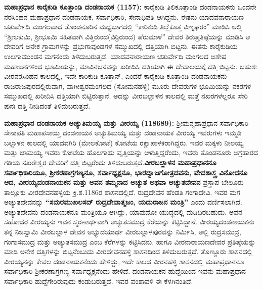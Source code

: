 \textbf{ಮಹಾಪ್ರಧಾನ ಕಾರೈಕುಡಿ ಕೂತ್ತಾಂಡಿ ದಂಡನಾಯಕ (1157):} ಕಾರೈಕುಡಿ ತಿಲಿಕೂತ್ತಾಂಡಿ ದಂಡನಾಯಕನು ಒಂದನೇ ನರಸಿಂಹನ ಮಹಾಪ್ರಧಾನ ದಂಡನಾಯಕ, ಸರ್ವಾಧಿಕಾರಿ, ಸೇನಾಧಿಪತಿ ಆಗಿದ್ದನು. ಈತನು ಯಾದವ\-ನಾರಾಯಣ ಚತುರ್ವೇದಿ ಮಂಗಲವಾದ ತೊಂಡನೂರಿನ ಮಧ್ಯಭಾಗದಲ್ಲಿ “ಕಾರಿಕುಡಿ ತಿಲ್ಲೆಕೂತ್ತ ವಿಣ್ನಘರಂ” ಮಾಡಿಸಿ ಅಲ್ಲಿ “ಶ‍್ರೀಲಕುಮಿ, ಶ‍್ರೀಭೂಮಿ ಸಹಿತವಾಗಿ ವಿತ್ತಿರುಂದ(ವಿರ್ರಿರುಂದ) ಪೆರುಮಾಳೆ” ದೇವರ ತಿರುಪ್ರತಿಷ್ಠೆಯನ್ನು ಮಾಡಿಸಿ ಆ ದೇವರಿಗೆ ಅನೇಕ ಗ್ರಾಮಗಳನ್ನು ಪ್ರಭುಗಾವುಂಡಗಳ ಸಮ್ಮುಖದಲ್ಲಿ ದತ್ತಿಯಾಗಿ ಬಿಟ್ಟನು. ಈತನು ಕಾರೈಕುಡಿಯ ಉಲಗಾಮುಂಡನ ಮಗನೆಂದು ತಿಳಿದುಬರುತ್ತದೆ. ಯಾದವನಾರಾಯಣ ಚತುರ್ವೇದಿ ಮಂಗಲದ ಅಶೇಷ ಮಹಾಜನ\-ಗಳಿಂದ ಭೂಮಿಯನ್ನು, ಮಾವಿನಬನವನ್ನು ಖರೀದಿಸಿ ದತ್ತಿಯಾಗಿ ಈ ದೇವಾಲಯಕ್ಕೆ ದತ್ತಿ ಬಿಟ್ಟನು. ಬಹುಶಃ ವೀರನರಸಿಂಹನ ಕಾಲದಲ್ಲಿ, ಇದೇ ಕಾರಿಕುಡಿ ಕೂತ್ತಾನ್​, ಎಂದರೆ ಕಾರೈಕುಡಿ ಕೂತ್ತಾಂಡಿ ದಂಡನಾಯಕನು ರಾಜರಾಜಪುರ\-ದಲ್ಲಿರುವಾಗ, ವಾಗೀಶ್ವರಮಂಗಲದ (ಸೋಮನಹಳ್ಳಿ) ಮೂರು ದೇವರುಗಳ ಭೂಮಿಯನ್ನು ನಕರಗಳ ಸಮ್ಮುಖದಲ್ಲಿ ಖರೀದಿಸಿ ದತ್ತಿಯಾಗಿ ಬಿಟ್ಟಿರುತ್ತಾನೆ. ಅದನ್ನು ವೀರಬಲ್ಲಾಳನ ಕಾಲದಲ್ಲಿ ಮತ್ತೆ ನಖರಗಳೆಲ್ಲರೂ ಸೇರಿ ಪುನಃ ದತ್ತಿ ನೀಡಿದಂತೆ ತಿಳಿದುಬರುತ್ತದೆ.

\textbf{ಮಹಾಪ್ರಧಾನ ದಂಡನಾಯಕ ಅಚ್ಯುತಿಮಯ್ಯ ಮತ್ತು ವೀರಯ್ಯ (1186\general{\enginline{-}}89):} ಶ‍್ರೀಮನ್ಮಹಾಪ್ರಧಾನ ಸರ್ವಾಧಿಕಾರಿ ಸೇನಾಪತಿ ಮಹಾಪಸಾಯ್ತ ದಂಡನಾಯಕ ಅಚ್ಯುತಿಮಯ್ಯ ಮತ್ತು ದಂಡನಾಯಕ ವೀರಯ್ಯ ಇವರುಗಳು ಇಮ್ಮಡಿ ಬಲ್ಲಾಳನ ಕಾಲದಲ್ಲಿ ಯಾದವಗಿರಿ (ಮೇಲಕೋಟೆ) ಕೋಟೆಯ ರಕ್ಷಾಪಾಳಕರಾಗಿದ್ದರು. ಇವರ ಮಕ್ಕಳು ನೀಲಯ್ಯ ಮತ್ತು ಚಾಮಯ್ಯ ಇವರು ಕೋಟೆಯ ಹೊಲಗಾಹು ವೃತ್ತಿಯನ್ನು ಆಳುತ್ತಿದ್ದರೆಂದು, ಇವರು ತೊಂಡನೂರು ಅಗ್ರಹಾರದ ಗಡಿಯ ನಖರೇಶ್ವರ ದೇವರಿಗೆ ದತ್ತಿ ಬಿಟ್ಟರೆಂದು ತಿಳಿದುಬರುತ್ತದೆ.\textbf{ವೀರಬಲ್ಲಾಳನ ಮಹಾಪ್ರಧಾನನೂ ಸರ್ವಾಧಿಕಾರಿಯೂ, ಶ‍್ರೀಕರಣಾಗ್ರಗಣ್ಯನೂ, ಸರ್ವಾಧ್ಯಕ್ಷನೂ, ಭಾರದ್ವಾಜಗೋತ್ರದವನು, ವೇದಶಾಸ್ತ್ರ ವಿನೋದನೂ ಆದ, ವೀರಯ್ಯದಂಡನಾಯಕನ ಮತ್ತು ಅವನ ತಮ್ಮನಾದ ಅಚ್ಯುತ ಅಥವಾ ಅಚ್ಯುತದೇವನ }ಪ್ರಸ್ತಾಪ ಬೇಲೂರು ತಾಲ್ಲೂಕು ವೀರದೇವನಹಳ್ಳಿಯ ಕ್ರಿ.ಶ.1186ರ ಶಾಸನ\-ದಲ್ಲಿದೆ. ರುದ್ರದೇವನ ಹೆಂಡತಿ ಗಂಗಾದೇವಿ. ಇವರ ಮಗ ಅಚ್ಯುತದೇವನನ್ನು \textbf{“ಸಮರಮುಖಲಸದ್​ ರುದ್ರದೇವಾತ್ಮಜಂ, ಯದುರಾಜನ ಮಂತ್ರಿ”} ಎಂದು ವರ್ಣಿಸಲಾಗಿದೆ. ಅಚ್ಯುತದೇವನು ದಂಡನಾಯಕನೂ ಮಂತ್ರಿಯೂ ಆಗಿದ್ದು, ಯಾವುದೋ ಯುದ್ಧದಲ್ಲಿ ಮಡಿದಿರಬಹುದು. ಅವನ ಸಹೋದರ ವೀರಯ್ಯನು ಇವನ ಸ್ಮರಣಾರ್ಥವಾಗಿ ಅಚ್ಯುತಸಮುದ್ರ ಕೆರೆಯನ್ನು ಕಟ್ಟಿಸಿದ್ದಾನೆ. ವೀರಯ್ಯದಂಡನಾಯಕನು ತನ್ನ ನಿಜಸ್ವಾಮಿ ವೀರಬಲ್ಲಾಳ ದೇವನ ಅಭ್ಯುದಯಾರ್ಥ ವೀರಬಲ್ಲಾಳಪುರವನ್ನು ನಿರ್ಮಿಸಿ, ಅಲ್ಲಿ ರುದ್ರಸಮುದ್ರ, ಗಂಗಾಸಮುದ್ರ ಮತ್ತು ಅಚ್ಯುತಸಮುದ್ರ ಎಂಬ ಕೆರೆಗಳನ್ನು ಕಟ್ಟಿಸಿದನು. ಹಾಗೂ ವೀರನಾರಾಯಣದೇವರ ಪ್ರತಿಷ್ಠೆಯನ್ನು ಮಾಡಿ ಅನೇಕ ದತ್ತಿಗಳನ್ನು ಬಿಟ್ಟನೆಂಬುದು ವೀರದೇವನಹಳ್ಳಿ ಶಾಸನದಿಂದ ತಿಳಿದುಬರುತ್ತದೆ. ತೊಣ್ಣೂರು ಶಾಸನದಲ್ಲಿ ವೀರಯ್ಯನನ್ನು ಕೇವಲ ದಂಡನಾಯಕನೆಂದು ಹೇಳಿದ್ದು, ಇದೇ ಕಾಲದ ವೀರನಹಳ್ಳಿ ಶಾಸನದಲ್ಲಿ ಮಹಾಪ್ರಧಾನನೂ ಸರ್ವಾಧಿಕಾರಿ ಶ‍್ರೀಕರಣಾಗ್ರಗಣ್ಯ ಸರ್ವಾಧ್ಯಕ್ಷನೆಂದು ಹೇಳಿದೆ. ದಂಡನಾಯಕನ ಹುದ್ದೆಯಿಂದ ಇವನು ಮಹಾಪ್ರಧಾನ ಸರ್ವಾಧಿಕಾರಿ ಹುದ್ದೆಗೇರಿರುವುದು ಕಂಡುಬರುತ್ತದೆ. ಇವರ ವಂಶಾವಳಿ ಈ ಕೆಳಗಿನಂತಿದೆ.

